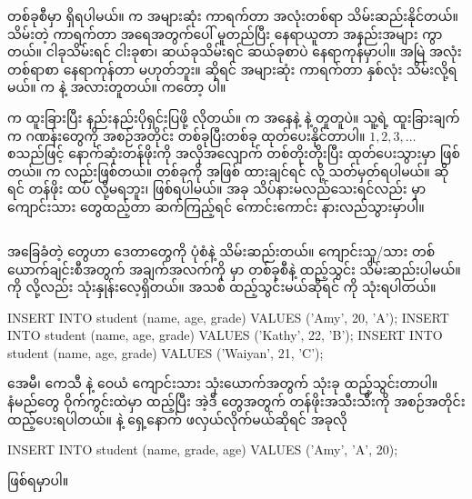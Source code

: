  တစ်ခုစီမှာ  ရှိရပါမယ်။  က အများဆုံး ကာရက်တာ အလုံးတစ်ရာ သိမ်းဆည်းနိုင်တယ်။ သိမ်းတဲ့ ကာရက်တာ အရေအတွက်ပေါ် မူတည်ပြီး နေရာယူတာ အနည်းအများ ကွာတယ်။ ငါခုသိမ်းရင် ငါးခုစာ၊ ဆယ်ခုသိမ်းရင် ဆယ်ခုစာပဲ နေရာကုန်မှာပါ။ အမြဲ အလုံး တစ်ရာစာ နေရာကုန်တာ မဟုတ်ဘူး။  ဆိုရင် အများဆုံး  ကာရက်တာ နှစ်လုံး သိမ်းလို့ရမယ်။   က   နဲ့ အလားတူတယ်။  ကတော့  ပါ။

  က ထူးခြားပြီး နည်းနည်းပိုရှင်းပြဖို့ လိုတယ်။  က  အနေနဲ့  နဲ့ တူတူပဲ။ သူ့ရဲ့ ထူးခြားချက်က ဂဏန်းတွေကို အစဉ်အတိုင်း တစ်ခုပြီးတစ်ခု ထုတ်ပေးနိုင်တာပါ။ $1, 2, 3,\ldots$ စသည်ဖြင့်  နောက်ဆုံးတန်ဖိုးကို အလိုအလျောက် တစ်တိုးတိုးပြီး ထုတ်ပေးသွားမှာ ဖြစ်တယ်။   က  လည်းဖြစ်တယ်။  တစ်ခုကို  အဖြစ် ထားချင်ရင်  လို့ သတ်မှတ်ရပါမယ်။  ဆိုရင်  တန်ဖိုး ထပ်  လို့မရဘူး၊  ဖြစ်ရပါမယ်။ အခု သိပ်နားမလည်သေးရင်လည်း  မှာ ကျောင်းသား  တွေထည့်တာ ဆက်ကြည့်ရင် ကောင်းကောင်း နားလည်သွားမှာပါ။

\subsection*{}
 အခြေခံတဲ့  တွေဟာ ဒေတာတွေကို  ပုံစံနဲ့ သိမ်းဆည်းတယ်။ ကျောင်းသူ/သား တစ်ယောက်ချင်းစီအတွက် အချက်အလက်ကို  မှာ   တစ်ခုစီနဲ့ ထည့်သွင်း သိမ်းဆည်းပါမယ်။  ကို  လို့လည်း သုံးနှုန်းလေ့ရှိတယ်။  အသစ် ထည့်သွင်းမယ်ဆိုရင်   ကို သုံးရပါတယ်။

%
\begin{sql}
INSERT INTO student (name, age, grade) VALUES ('Amy', 20, 'A');
INSERT INTO student (name, age, grade) VALUES ('Kathy', 22, 'B');
INSERT INTO student (name, age, grade) VALUES ('Waiyan', 21, 'C');
\end{sql}
%

အေမီ၊ ကေသီ နဲ့ ဝေယံ ကျောင်းသား သုံးယောက်အတွက်  သုံးခု ထည့်သွင်းတာပါ။  နံမည်တွေ ဝိုက်ကွင်းထဲမှာ ထည့်ပြီး အဲ့ဒီ  တွေအတွက် တန်ဖိုးအသီးသီးကို အစဉ်အတိုင်း ထည့်ပေးရပါတယ်။  နဲ့  ရှေ့နောက် ဖလှယ်လိုက်မယ်ဆိုရင် အခုလို
%
\begin{sql}
INSERT INTO student (name, grade, age) VALUES ('Amy', 'A',  20);
\end{sql}
%
ဖြစ်ရမှာပါ။

